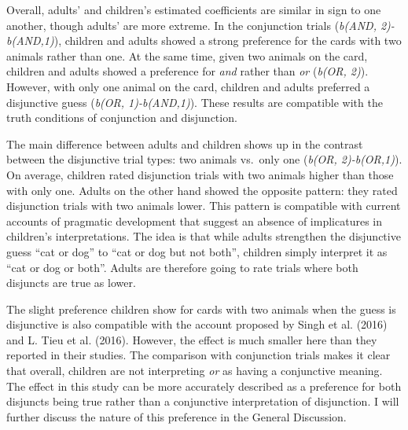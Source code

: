 \documentclass[oneside]{report}
\theoremstyle{definition}
\theoremstyle{definition}
\theoremstyle{definition}
\theoremstyle{remark}
\begin{document}
Overall, adults' and children's estimated coefficients are similar in
sign to one another, though adults' are more extreme. In the conjunction
trials (\emph{b(AND, 2)-b(AND,1)}), children and adults showed a strong
preference for the cards with two animals rather than one. At the same
time, given two animals on the card, children and adults showed a
preference for \emph{and} rather than \emph{or} (\emph{b(OR, 2)}).
However, with only one animal on the card, children and adults preferred
a disjunctive guess (\emph{b(OR, 1)-b(AND,1)}). These results are
compatible with the truth conditions of conjunction and disjunction.

The main difference between adults and children shows up in the contrast
between the disjunctive trial types: two animals vs.~only one
(\emph{b(OR, 2)-b(OR,1)}). On average, children rated disjunction trials
with two animals higher than those with only one. Adults on the other
hand showed the opposite pattern: they rated disjunction trials with two
animals lower. This pattern is compatible with current accounts of
pragmatic development that suggest an absence of implicatures in
children's interpretations. The idea is that while adults strengthen the
disjunctive guess ``cat or dog'' to ``cat or dog but not both'',
children simply interpret it as ``cat or dog or both''. Adults are
therefore going to rate trials where both disjuncts are true as lower.

The slight preference children show for cards with two animals when the
guess is disjunctive is also compatible with the account proposed by
Singh et al. (2016) and L. Tieu et al. (2016). However, the effect is
much smaller here than they reported in their studies. The comparison
with conjunction trials makes it clear that overall, children are not
interpreting \emph{or} as having a conjunctive meaning. The effect in
this study can be more accurately described as a preference for both
disjuncts being true rather than a conjunctive interpretation of
disjunction. I will further discuss the nature of this preference in the
General Discussion.
\end{document}
